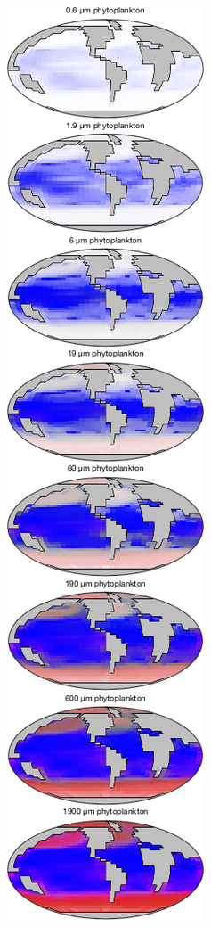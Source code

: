 \documentclass{article}
\begin{document}
\begin{figure}[htbp]
\centering
\begin{subfigure}{.33\textwidth}
\includegraphics[width=0.95\linewidth]{../Separate_figures/ECOGEM/SizeClass_Limitation.png}

\end{subfigure}
\end{figure}
\end{document}
